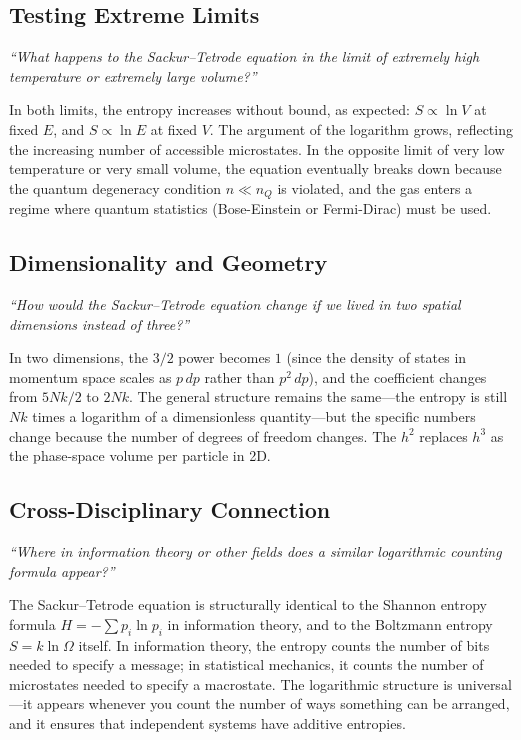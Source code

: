 \documentclass[11pt,openright]{book}
\begin{document}
\subsection*{Testing Extreme Limits}
\textit{``What happens to the Sackur--Tetrode equation in the limit of extremely high temperature or extremely large volume?''}

In both limits, the entropy increases without bound, as expected: $S \propto \ln V$ at fixed $E$, and $S \propto \ln E$ at fixed $V$. The argument of the logarithm grows, reflecting the increasing number of accessible microstates. In the opposite limit of very low temperature or very small volume, the equation eventually breaks down because the quantum degeneracy condition $n \ll n_Q$ is violated, and the gas enters a regime where quantum statistics (Bose-Einstein or Fermi-Dirac) must be used.

\subsection*{Dimensionality and Geometry}
\textit{``How would the Sackur--Tetrode equation change if we lived in two spatial dimensions instead of three?''}

In two dimensions, the $3/2$ power becomes $1$ (since the density of states in momentum space scales as $p\,dp$ rather than $p^2\,dp$), and the coefficient changes from $5Nk/2$ to $2Nk$. The general structure remains the same---the entropy is still $Nk$ times a logarithm of a dimensionless quantity---but the specific numbers change because the number of degrees of freedom changes. The $h^2$ replaces $h^3$ as the phase-space volume per particle in 2D.

\subsection*{Cross-Disciplinary Connection}
\textit{``Where in information theory or other fields does a similar logarithmic counting formula appear?''}

The Sackur--Tetrode equation is structurally identical to the Shannon entropy formula $H = -\sum p_i \ln p_i$ in information theory, and to the Boltzmann entropy $S = k\ln\Omega$ itself. In information theory, the entropy counts the number of bits needed to specify a message; in statistical mechanics, it counts the number of microstates needed to specify a macrostate. The logarithmic structure is universal---it appears whenever you count the number of ways something can be arranged, and it ensures that independent systems have additive entropies.
\end{document}
